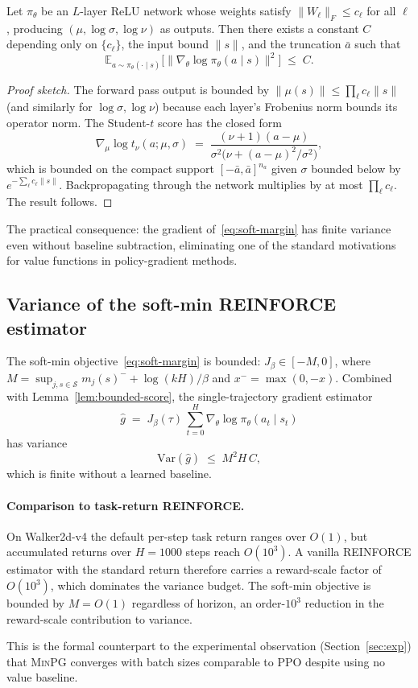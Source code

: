\begin{lemma}
\label{lem:bounded-score}
Let $\pi_\theta$ be an $L$-layer ReLU network whose weights satisfy
$\|W_\ell\|_F \le c_\ell$ for all $\ell$, producing
$(\mu, \log\sigma, \log\nu)$ as outputs. Then there exists a constant
$C$ depending only on $\{c_\ell\}$, the input bound $\|s\|$, and the
truncation $\bar a$ such that
\[
  \mathbb{E}_{a \sim \pi_\theta(\cdot \mid s)}\!\bigl[
    \|\nabla_\theta \log \pi_\theta(a \mid s)\|^2
  \bigr]
  \;\le\; C.
\]
\end{lemma}

\begin{proof}[Proof sketch]
The forward pass output is bounded by $\|\mu(s)\| \le \prod_\ell c_\ell
\|s\|$ (and similarly for $\log\sigma, \log\nu$) because each layer's
Frobenius norm bounds its operator norm. The Student-$t$ score has the
closed form
\[
  \nabla_\mu \log t_\nu(a; \mu, \sigma) \;=\;
  \frac{(\nu+1)(a - \mu)}
       {\sigma^2 \bigl(\nu + (a - \mu)^2 / \sigma^2\bigr)},
\]
which is bounded on the compact support $[-\bar a, \bar a]^{n_a}$ given
$\sigma$ bounded below by $e^{-\sum_\ell c_\ell \|s\|}$.
Backpropagating through the network multiplies by at most
$\prod_\ell c_\ell$. The result follows.
\end{proof}

The practical consequence: the gradient of~\eqref{eq:soft-margin} has
finite variance even without baseline subtraction, eliminating one of
the standard motivations for value functions in policy-gradient
methods.

\subsection{Variance of the soft-min REINFORCE estimator}
\label{sec:variance}

The soft-min objective~\eqref{eq:soft-margin} is bounded:
$J_\beta \in [-M, 0]$, where
$M = \sup_{j, s \in \mathcal{S}} m_j(s)^- + \log(kH)/\beta$ and
$x^- = \max(0, -x)$. Combined with Lemma~\ref{lem:bounded-score}, the
single-trajectory gradient estimator
\[
  \hat g \;=\; J_\beta(\tau)\,
  \sum_{t=0}^H \nabla_\theta \log \pi_\theta(a_t \mid s_t)
\]
has variance
\begin{equation}
  \label{eq:variance-bound}
  \mathrm{Var}(\hat g) \;\le\; M^2 H\, C,
\end{equation}
which is finite without a learned baseline.

\paragraph{Comparison to task-return REINFORCE.}
On Walker2d-v4 the default per-step task return ranges over
$O(1)$, but accumulated returns over $H = 1000$ steps reach $O(10^3)$.
A vanilla REINFORCE estimator with the standard return therefore
carries a reward-scale factor of $O(10^3)$, which dominates the
variance budget. The soft-min objective is bounded by $M = O(1)$
regardless of horizon, an order-$10^3$ reduction in the reward-scale
contribution to variance.

This is the formal counterpart to the experimental observation
(Section~\ref{sec:exp}) that \textsc{MinPG} converges with batch sizes
comparable to PPO despite using no value baseline.
